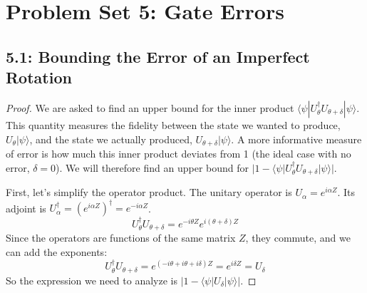 \documentclass{article}
\newcommand{\ket}[1]{|#1\rangle}
\newcommand{\bra}[1]{\langle#1|}
\begin{document}
\section*{Problem Set 5: Gate Errors}

\subsection*{5.1: Bounding the Error of an Imperfect Rotation}

\begin{proof}
We are asked to find an upper bound for the inner product $\bra{\psi} U_{\theta}^\dagger U_{\theta+\delta} \ket{\psi}$. This quantity measures the fidelity between the state we wanted to produce, $U_\theta \ket{\psi}$, and the state we actually produced, $U_{\theta+\delta} \ket{\psi}$. A more informative measure of error is how much this inner product deviates from 1 (the ideal case with no error, $\delta=0$). We will therefore find an upper bound for $|1 - \bra{\psi} U_{\theta}^\dagger U_{\theta+\delta} \ket{\psi}|$.

First, let's simplify the operator product. The unitary operator is $U_\alpha = e^{i\alpha Z}$. Its adjoint is $U_\alpha^\dagger = (e^{i\alpha Z})^\dagger = e^{-i\alpha Z}$.
\[ U_{\theta}^\dagger U_{\theta+\delta} = e^{-i\theta Z} e^{i(\theta+\delta)Z} \]
Since the operators are functions of the same matrix $Z$, they commute, and we can add the exponents:
\[ U_{\theta}^\dagger U_{\theta+\delta} = e^{(-i\theta + i\theta + i\delta)Z} = e^{i\delta Z} = U_\delta \]
So the expression we need to analyze is $|1 - \bra{\psi} U_\delta \ket{\psi}|$.


\end{proof}
\end{document}
